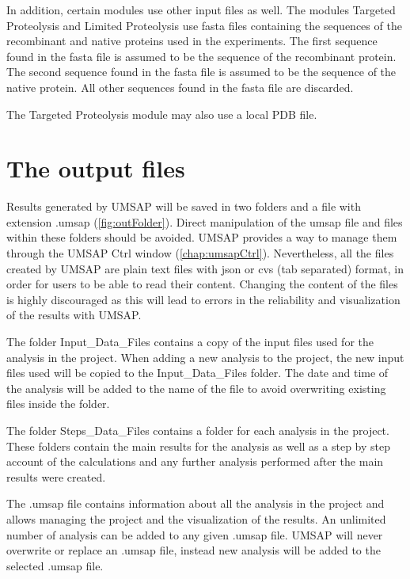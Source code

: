 In addition, certain modules use other input files as well. The modules Targeted
Proteolysis and Limited Proteolysis use fasta files containing the sequences of
the recombinant and native proteins used in the experiments. The first sequence
found in the fasta file is assumed to be the sequence of the recombinant protein.
The second sequence found in the fasta file is assumed to be the sequence of the
native protein. All other sequences found in the fasta file are discarded.

The Targeted Proteolysis module may also use a local PDB file. 

\section{The output files}
\label{sec:outFile}

Results generated by UMSAP will be saved in two folders and a file with extension
.umsap (\autoref{fig:outFolder}). Direct manipulation of the umsap file and files
within these folders should be avoided. UMSAP provides a way to manage them through
the UMSAP Ctrl window (\autoref{chap:umsapCtrl}). Nevertheless, all the files created
by UMSAP are plain text files with json or cvs (tab separated) format, in order for
users to be able to read their content. Changing the content of the files is highly
discouraged as this will lead to errors in the reliability and visualization of the
results with UMSAP.

The folder Input{\_}Data{\_}Files contains a copy of the input files used for the analysis
in the project. When adding a new analysis to the project, the new input files used
will be copied to the Input{\_}Data{\_}Files folder. The date and time of the analysis will
be added to the name of the file to avoid overwriting existing files inside the folder.

The folder Steps{\_}Data{\_}Files contains a folder for each analysis in the project.
These folders contain the main results for the analysis as well as a step by step
account of the calculations and any further analysis performed after the main results
were created.

The .umsap file contains information about all the analysis in the project and allows
managing the project and the visualization of the results. An unlimited number of
analysis can be added to any given .umsap file. UMSAP will never overwrite or replace
an .umsap file, instead new analysis will be added to the selected .umsap file.

